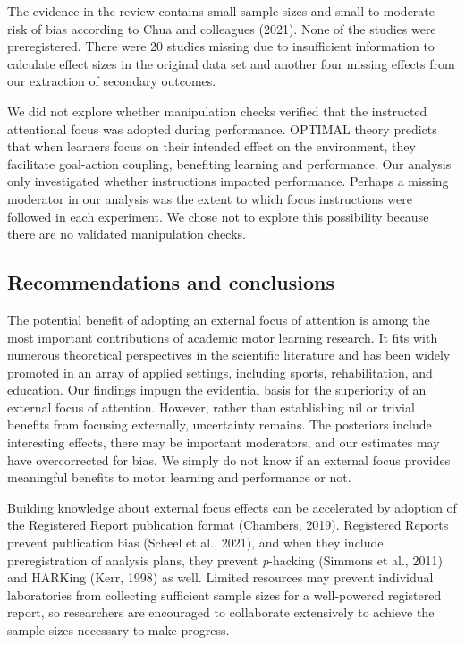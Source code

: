 \documentclass[
  11pt,
  doc, donotrepeattitle,floatsintext]{apa7}
\begin{document}
The evidence in the review contains small sample sizes and small to moderate risk of bias according to Chua and colleagues (2021). None of the studies were preregistered. There were 20 studies missing due to insufficient information to calculate effect sizes in the original data set and another four missing effects from our extraction of secondary outcomes.

We did not explore whether manipulation checks verified that the instructed attentional focus was adopted during performance. OPTIMAL theory predicts that when learners focus on their intended effect on the environment, they facilitate goal-action coupling, benefiting learning and performance. Our analysis only investigated whether instructions impacted performance. Perhaps a missing moderator in our analysis was the extent to which focus instructions were followed in each experiment. We chose not to explore this possibility because there are no validated manipulation checks.

\hypertarget{recommendations-and-conclusions}{%
\subsection{Recommendations and conclusions}\label{recommendations-and-conclusions}}

The potential benefit of adopting an external focus of attention is among the most important contributions of academic motor learning research. It fits with numerous theoretical perspectives in the scientific literature and has been widely promoted in an array of applied settings, including sports, rehabilitation, and education. Our findings impugn the evidential basis for the superiority of an external focus of attention. However, rather than establishing nil or trivial benefits from focusing externally, uncertainty remains. The posteriors include interesting effects, there may be important moderators, and our estimates may have overcorrected for bias. We simply do not know if an external focus provides meaningful benefits to motor learning and performance or not.

Building knowledge about external focus effects can be accelerated by adoption of the Registered Report publication format (Chambers, 2019). Registered Reports prevent publication bias (Scheel et al., 2021), and when they include preregistration of analysis plans, they prevent \emph{p}-hacking (Simmons et al., 2011) and HARKing (Kerr, 1998) as well. Limited resources may prevent individual laboratories from collecting sufficient sample sizes for a well-powered registered report, so researchers are encouraged to collaborate extensively to achieve the sample sizes necessary to make progress.
\end{document}
